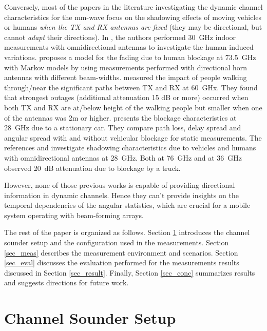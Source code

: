 \documentclass[conference]{IEEEtran}
\begin{document}
Conversely, most of the papers in the literature investigating the dynamic channel characteristics for the mm-wave focus on the shadowing effects of moving vehicles or humans  {\em when the TX and RX antennas are fixed} (they may be directional, but cannot {\em adapt} their directions). In \cite{Marinier1998temporal}, the authors performed \SI{30}{GHz} indoor measurements with omnidirectional antennas to investigate the human-induced variations. \cite{maccartney2017rapid} proposes a model for the fading due to human blockage at \SI{73.5}{GHz} with Markov models by using measurements performed with directional horn antennas with different beam-widths. \cite{collonge2004influence} measured the impact of people walking through/near the significant paths between TX and RX at \SI{60}{GHx}. They found that strongest outages (additional attenuation 15 dB or more) occurred when both TX and RX are at/below height of the walking people but smaller when one of the antennas was 2m or higher.\cite{Park_2017_vehicular} presents the blockage characteristics at \SI{28}{GHz} due to a stationary car. They compare path loss, delay spread and angular spread with and without vehicular blockage for static measurements. The references \cite{Weiler_et_al_2016_quasideterministic} and \cite{Weiler_et_al_2016_WCL} investigate shadowing characteristics due to vehicles and humans with omnidirectional antennas at \SI{28}{GHz}. Both \cite{Semkin_et_al_2015_EuCAP} at \SI{76}{GHz} and \cite{Sato_et_al_2001_V2I_RoF} at \SI{36}{GHz} observed \SI{20}{dB} attenuation due to blockage by a truck.


However, none of those previous works is capable of providing directional information in dynamic channels. Hence they can't provide insights on the temporal dependencies of the angular statistics, which are crucial for a mobile system operating with beam-forming arrays. 






The rest of the paper is organized as follows. Section \ref{sec_design} introduces the channel sounder setup and the configuration used in the measurements. Section \ref{sec_meas} describes the measurement environment and scenarios. Section \ref{sec_eval} discusses the evaluation performed for the measurements results discussed in Section \ref{sec_result}. Finally, Section \ref{sec_conc} summarizes results and suggests directions for future work.



\section{Channel Sounder Setup} \label{sec_design}
\end{document}
